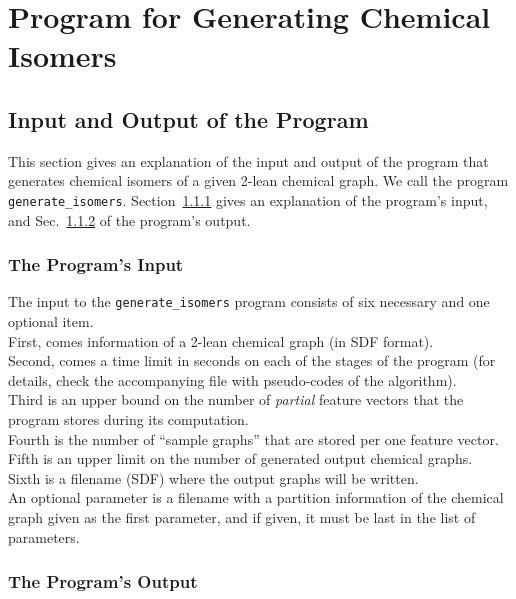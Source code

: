 \documentclass[11pt,titlepage,dvipdfmx,twoside]{book}
\begin{document}
\section{Program for Generating Chemical Isomers}
\label{sec: main}

\subsection{Input and Output of the Program}
\label{sec:InOut_m}

This section gives an explanation of the input and output
of the program that generates chemical isomers
of a given 2-lean chemical graph.
We call the program {\tt generate\_isomers}.
Section~\ref{sec:Input_m} gives an explanation of the program's input, and
Sec.~\ref{sec:Output_m} of the program's output.

\subsubsection{The Program's Input}
\label{sec:Input_m}


The input to the {\tt generate\_isomers} program
consists of six necessary and one optional item. \\
First, comes information of a 2-lean chemical graph (in SDF format).\\
Second, comes a time limit in seconds on each of the stages of the program 
(for details, check the accompanying file with pseudo-codes of the algorithm).\\
Third is an upper bound on the number of {\em partial} feature vectors that the program stores
during its computation. \\
Fourth is the number of ``sample graphs'' that are stored per one feature vector.\\
Fifth is an upper limit on the number of generated output chemical graphs. \\
Sixth is a filename (SDF) where the output graphs will be written.\\
An optional parameter is a filename with a partition information of
the chemical graph given as the first parameter, and if given, it must be last
in the list of parameters.



\subsubsection{The Program's Output}
\label{sec:Output_m}
\end{document}
